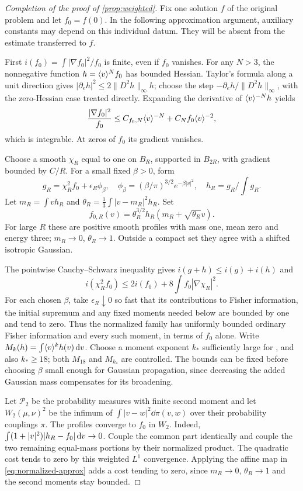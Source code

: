 \begin{proof}[Completion of the proof of \cref{prop:weighted}]
Fix one solution $f$ of the original problem and let $f_0=f(0)$. In the following approximation argument, auxiliary constants may depend on this individual datum. They will be absent from the estimate transferred to $f$.

First $i(f_0)=\int|\nabla f_0|^2/f_0$ is finite, even if $f_0$ vanishes. For any $N>3$, the nonnegative function $h=\langle v\rangle^Nf_0$ has bounded Hessian. Taylor's formula along a unit direction gives
$|\partial_eh|^2\le2\|D^2h\|_\infty h$; choose the step $-\partial_eh/\|D^2h\|_\infty$, with the zero-Hessian case treated directly. Expanding the derivative of $\langle v\rangle^{-N}h$ yields
\[
 \frac{|\nabla f_0|^2}{f_0}\le C_{f_0,N}\langle v\rangle^{-N}+C_Nf_0\langle v\rangle^{-2},
\]
which is integrable. At zeros of $f_0$ its gradient vanishes.

Choose a smooth $\chi_R$ equal to one on $B_R$, supported in $B_{2R}$, with gradient bounded by $C/R$. For a small fixed $\beta>0$, form
\[
 g_R=\chi_R^2f_0+\epsilon_R\phi_\beta,\quad
 \phi_\beta=(\beta/\pi)^{3/2}e^{-\beta|v|^2},\quad
 h_R=g_R/\int g_R.
\]
Let $m_R=\int vh_R$ and $\theta_R=\frac13\int|v-m_R|^2h_R$. Set
\begin{equation}\label{eq:normalized-approx}
 f_{0,R}(v)=\theta_R^{3/2}h_R(m_R+\sqrt{\theta_R}v).
\end{equation}
For large $R$ these are positive smooth profiles with mass one, mean zero and energy three; $m_R\to0$, $\theta_R\to1$. Outside a compact set they agree with a shifted isotropic Gaussian.

The pointwise Cauchy--Schwarz inequality gives $i(g+h)\le i(g)+i(h)$ and
\[
 i(\chi_R^2f_0)\le2i(f_0)+8\int f_0|\nabla\chi_R|^2.
\]
For each chosen $\beta$, take $\epsilon_R\downarrow0$ so fast that its contributions to Fisher information, the initial supremum and any fixed moments needed below are bounded by one and tend to zero. Thus the normalized family has uniformly bounded ordinary Fisher information and every such moment, in terms of $f_0$ alone. Write $M_k(h)=\int\langle v\rangle^kh(v)\,\mathrm dv$. Choose a moment exponent $k_*$ sufficiently large for \cite[Theorem~2.3]{GS}, and also $k_*\ge18$; both $M_{18}$ and $M_{k_*}$ are controlled. The bounds can be fixed before choosing $\beta$ small enough for Gaussian propagation, since decreasing the added Gaussian mass compensates for its broadening.

Let $\mathcal P_2$ be the probability measures with finite second moment and let $W_2(\mu,\nu)^2$ be the infimum of $\int|v-w|^2\dd\pi(v,w)$ over their probability couplings $\pi$. The profiles converge to $f_0$ in $W_2$. Indeed,
$\int(1+|v|^2)|h_R-f_0|\,\mathrm dv\to0$. Couple the common part identically and couple the two remaining equal-mass portions by their normalized product. The quadratic cost tends to zero by this weighted $L^1$ convergence. Applying the affine map in \eqref{eq:normalized-approx} adds a cost tending to zero, since $m_R\to0$, $\theta_R\to1$ and the second moments stay bounded.


\end{proof}
